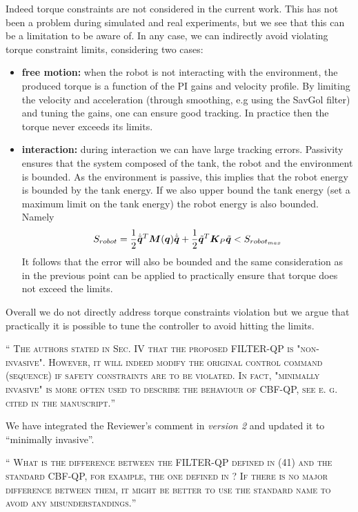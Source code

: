 \documentclass[10pt]{article}
\newcommand{\referee}[1]{\;
  \begin{minipage}[t]{.95\textwidth}
    ``{\small\color{red} \textsc{#1}}''
  \end{minipage}\medskip
  }
\newcommand{\version}[1]{\textit{version #1}}
\begin{document}
\begin{enumerate}[label={[R3:\,\arabic{enumi}]}]
Indeed torque constraints are not considered in the current work. This has not been a problem during simulated and real experiments, but we see that this can be a limitation to be aware of. In any case, we can indirectly avoid violating torque constraint limits, considering two cases:
\begin{itemize}
    \item \textbf{free motion:} when the robot is not interacting with the environment, the produced torque is a function of the PI gains and velocity profile. By limiting the velocity and acceleration (through smoothing, e.g using the SavGol filter) and tuning the gains, one can ensure good tracking. In practice then the torque never exceeds its limits.
    \item \textbf{interaction:} during interaction we can have large tracking errors. Passivity ensures that the system composed of the tank, the robot and the environment is bounded. As the environment is passive, this implies that the robot energy is bounded by the tank energy. If we also upper bound the tank energy (set a maximum limit on the tank energy) the robot energy is also bounded. Namely
    \begin{equation*}
    S_{robot} = \frac{1}{2} \dot{\tilde{\bm{q}}}^T \bm{M}(\bm{q}) \dot{\tilde{\bm{q}}} + \frac{1}{2}\tilde{\bm{q}}^T \bm{K}_P \tilde{\bm{q}} < S_{robot_{max}}
    \end{equation*}
    It follows that the error will also be bounded and the same consideration as in the previous point can be applied to practically ensure that torque does not exceed the limits.
\end{itemize}
Overall we do not directly address torque constraints violation but we argue that practically it is possible to tune the controller to avoid hitting the limits.

\item\label{reply:R3:11} 
\referee{The authors stated in Sec. IV that the proposed FILTER-QP is "non-invasive". However, it will indeed modify the original control command (sequence) if safety constraints are to be violated. In fact, "minimally invasive" is more often used to describe the behaviour of CBF-QP, see e. g. \cite{ames2019control} cited in the manuscript.}

We have integrated the Reviewer's comment in \version{2} and updated it to “minimally invasive”.

\item\label{reply:R3:12} 
\referee{What is the difference between the FILTER-QP defined in (41) and the standard CBF-QP, for example, the one defined in \cite{ames2019control}? If there is no major difference between them, it might be better to use the standard name to avoid any misunderstandings.}



\end{enumerate}
\end{document}
